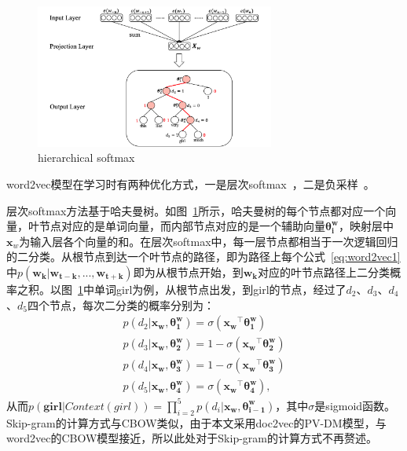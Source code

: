 \begin{figure}[h]
  \centering
  \includegraphics[width=0.7\textwidth]{hierarchical_softmax.png}
  \caption{hierarchical softmax}
  \label{fig:hsoftmax}
\end{figure}

word2vec模型在学习时有两种优化方式，一是层次softmax~\autocite{morin2005hierarchical}，二是负采样~\autocite{mikolov2013distributed}。\par
层次softmax方法基于哈夫曼树。如图~\ref{fig:hsoftmax}所示，哈夫曼树的每个节点都对应一个向量，叶节点对应的是单词向量，而内部节点对应的是一个辅助向量$\bm {\theta^w_i}$，映射层中$\bm x_w$为输入层各个向量的和。在层次softmax中，每一层节点都相当于一次逻辑回归的二分类。从根节点到达一个叶节点的路径，即为路径上每个公式~\ref{eq:word2vec1}中$p(\bm {w_k}|\bm {w_{t-k}}, ..., \bm{w_{t+k}})$即为从根节点开始，到$\bm {w_k}$对应的叶节点路径上二分类概率之积。以图~\ref{fig:hsoftmax}中单词girl为例，从根节点出发，到girl的节点，经过了$d_2$、$d_3$、$d_4$、$d_5$四个节点，每次二分类的概率分别为：
\begin{equation}
  \label{eq:hsoftmax}
  \begin{gathered}
  p(d_2|\bm {x_w}, \bm {\theta_1^w}) = \sigma(\bm {x_w}^\top \bm{\theta_1^w})\\
  p(d_3|\bm {x_w}, \bm {\theta_2^w}) = 1-\sigma(\bm {x_w}^\top \bm{\theta_2^w})\\
  p(d_4|\bm {x_w}, \bm {\theta_3^w}) = 1-\sigma(\bm {x_w}^\top \bm{\theta_3^w})\\
  p(d_5|\bm {x_w}, \bm {\theta_4^w}) = \sigma(\bm {x_w}^\top \bm{\theta_4^w}),
  \end{gathered}
\end{equation}
从而$p(\bm {girl}|Context(girl)) = \prod_{i=2}^5 p(d_i|\bm {x_w}, \bm {\theta_{i-1}^w})$，其中$\sigma$是sigmoid函数。Skip-gram的计算方式与CBOW类似，由于本文采用doc2vec的PV-DM模型，与word2vec的CBOW模型接近，所以此处对于Skip-gram的计算方式不再赘述。\par

